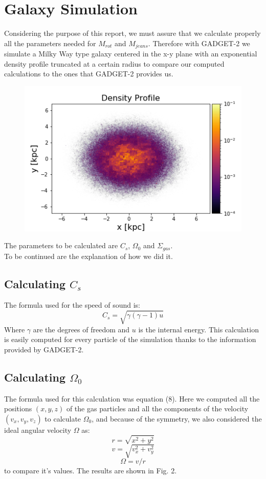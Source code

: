 \documentclass{aa}
\begin{document}
  
   \section{Galaxy Simulation}
   Considering the purpose of this report, we must assure that we calculate properly all the parameters needed for $M_{rot}$ and $M_{jeans}$. Therefore with GADGET-2 we simulate a Milky Way type galaxy centered in the x-y plane with an exponential density profile truncated at a certain radius to compare our computed calculations to the ones that GADGET-2 provides us. \\
   \begin{figure}[h!]
   \includegraphics[scale=0.55]{Galaxy.png}
   \caption{}
   \centering
   \label{fig:boat1}
   \end{figure}
   The parameters to be calculated are $C_s$, $\Omega_0$ and $\Sigma_{gas}$.\\ To be continued are the explanation of how we did it.
   \subsection{Calculating $C_s$}
   The formula used for the speed of sound is: 
   \begin{equation}
       C_s = \sqrt{\gamma (\gamma - 1) u}
   \end{equation}
   Where $\gamma$ are the degrees of freedom and $u$ is the internal energy. This calculation is easily computed for every particle of the simulation thanks to the information provided by GADGET-2.  
   \subsection{Calculating $\Omega_0$}
   The formula used for this calculation was equation (8). Here we computed all the positions $(x,y,z)$ of the gas particles and all the components of the velocity $(v_x, v_y, v_z)$ to calculate $\Omega_0$, and because of the symmetry, we also considered the ideal angular velocity $\Omega$ as:
   \begin{equation}
       r = \sqrt{x^2 + y^2}
   \end{equation}
   \begin{equation}
       v = \sqrt{v_x^2 + v_y^2}
   \end{equation}
   \begin{equation}
       \Omega = v/r
   \end{equation}
   to compare it's values. The results are shown in Fig. 2.
   
\end{document}
